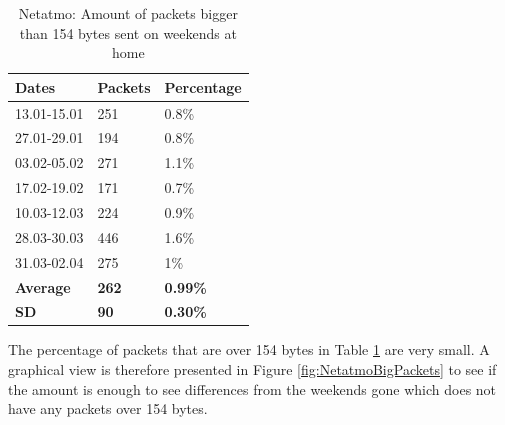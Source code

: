 \begin{table}[H]
    \centering
    \caption{Netatmo: Amount of packets bigger than 154 bytes sent on weekends at home}
    \begin{tabular}{|l|l|l|}
        \hline
        \textbf{Dates}   & \textbf{Packets} & \textbf{Percentage} \\ \hline
        13.01-15.01      & 251              & 0.8\%               \\ \hline
        27.01-29.01      & 194              & 0.8\%               \\ \hline
        03.02-05.02      & 271              & 1.1\%               \\ \hline
        17.02-19.02      & 171              & 0.7\%               \\ \hline
        10.03-12.03      & 224              & 0.9\%               \\ \hline
        28.03-30.03      & 446              & 1.6\%               \\ \hline
        31.03-02.04      & 275              & 1\%                 \\ \hline
        \textbf{Average} & \textbf{262}     & \textbf{0.99\%}     \\ \hline
        \textbf{SD} & \textbf{90}      & \textbf{0.30\%}     \\ \hline
    \end{tabular}
    \label{tab:NetatmoBigPackets}
\end{table}

The percentage of packets that are over 154 bytes in Table \ref{tab:NetatmoBigPackets} are very small. A graphical view is therefore presented in Figure \ref{fig:NetatmoBigPackets} to see if the amount is enough to see differences from the weekends gone which does not have any packets over 154 bytes.

